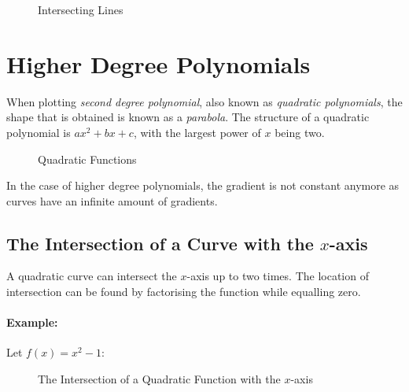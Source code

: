 \documentclass[a5paper,9pt]{book}
\theoremstyle{definition}
\begin{document}
        \begin{figure}[ht]
            \centering
            
            \caption{Intersecting Lines}%
            \label{fig:intersecting_lines}
        \end{figure}

        \pagebreak

        \section{Higher Degree Polynomials}\label{sec:higher_degree_polynomials}

        When plotting \emph{second degree polynomial}, also known as \emph{quadratic polynomials},
        the shape that is obtained is known as a \emph{parabola}. The structure of a
        quadratic polynomial is $ax^2 + bx + c$, with the largest power of $x$ being two.

        \begin{figure}[ht]
            \centering
            
            \caption{Quadratic Functions}%
            \label{fig:quadratic_functions}
        \end{figure}

        In the case of higher degree polynomials, the gradient is not constant anymore
        as curves have an infinite amount of gradients.

        \pagebreak

        \subsection{The Intersection of a Curve with the $x$-axis}

        A quadratic curve can intersect the $x$-axis up to two times. The location of
        intersection can be found by factorising the function while equalling zero.

        \paragraph{Example:} Let $f(x)=x^2-1$:

        \begin{figure}[ht]
            \centering
            
            \caption{The Intersection of a Quadratic Function with the $x$-axis}%
            \label{fig:quadratic_xAxis_intersection}
        \end{figure}
\end{document}
